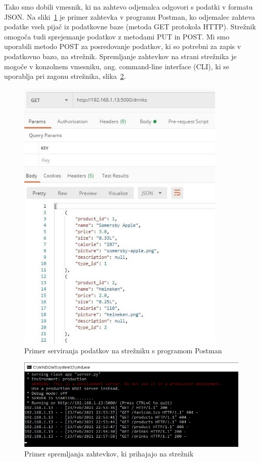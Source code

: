 \documentclass[a4paper, 12pt]{book}
\begin{document}
Tako smo dobili vmesnik, ki na zahtevo odjemalca odgovori s podatki v formatu JSON. Na sliki~\ref{ServerEX} je primer zahtevka v programu Postman, ko odjemalec zahteva podatke vseh pijač iz podatkovne baze (metoda GET protokola HTTP). Strežnik omogoča tudi sprejemanje podatkov z metodami PUT in POST. Mi smo uporabili metodo POST za posredovanje podatkov, ki so potrebni za zapis v podatkovno bazo, na strežnik. Spremljanje zahtevkov na strani strežnika je mogoče v konzolnem vmesniku, ang. command-line interface (CLI), ki se uporablja pri zagonu strežnika, slika~\ref{ServerEX2}.

\begin{figure}[!htb]   
\begin{center}
\includegraphics[width=10cm]{Server_example.jpg}
\caption{Primer serviranja podatkov na strežniku s programom Postman}
\label{ServerEX}
\end{center}
\end{figure}

\begin{figure}[!htb]
\begin{center}
\includegraphics[width=12cm]{Server_example_2.jpg}
\caption{Primer spremljanja zahtevkov, ki prihajajo na strežnik}
\label{ServerEX2}
\end{center}
\end{figure}
\end{document}
